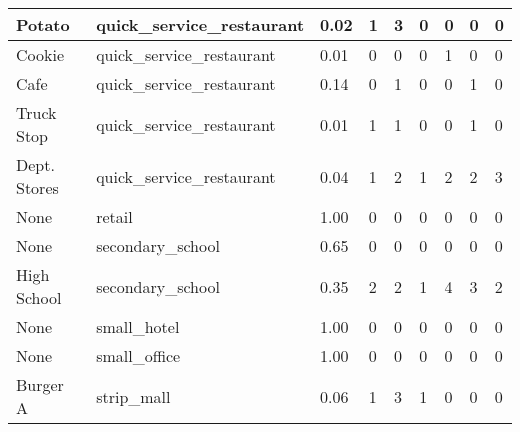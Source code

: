 \begin{table}[]
\begin{tabular}{|l|l|l|l|l|l|l|l|l|}
    Potato                   & quick\_service\_restaurant      & 0.02                               & 1                & 3              & 0                & 0             & 0              & 0                \\ \hline
    Cookie                   & quick\_service\_restaurant      & 0.01                               & 0                & 0              & 0                & 1             & 0              & 0                \\ \hline
    Cafe                     & quick\_service\_restaurant      & 0.14                               & 0                & 1              & 0                & 0             & 1              & 0                \\ \hline
    Truck Stop               & quick\_service\_restaurant      & 0.01                               & 1                & 1              & 0                & 0             & 1              & 0                \\ \hline
    Dept. Stores             & quick\_service\_restaurant      & 0.04                               & 1                & 2              & 1                & 2             & 2              & 3                \\ \hline
    None                     & retail                          & 1.00                               & 0                & 0              & 0                & 0             & 0              & 0                \\ \hline
    None                     & secondary\_school               & 0.65                               & 0                & 0              & 0                & 0             & 0              & 0                \\ \hline
    High School              & secondary\_school               & 0.35                               & 2                & 2              & 1                & 4             & 3              & 2                \\ \hline
    None                     & small\_hotel                    & 1.00                               & 0                & 0              & 0                & 0             & 0              & 0                \\ \hline
    None                     & small\_office                   & 1.00                               & 0                & 0              & 0                & 0             & 0              & 0                \\ \hline
    Burger A                 & strip\_mall                     & 0.06                               & 1                & 3              & 1                & 0             & 0              & 0                \\ \hline

\end{tabular}
\end{table}

